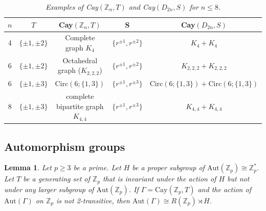 \documentclass[12pt,reqno,a4paper]{amsart}
\theoremstyle{definition}
\newtheorem{lem}[defn]{Lemma}
\begin{document}
\begin{table}[h!]
\centering
\begin{tabular}{|c|c|c|c|c|}
\hline
$n$ & $T$ & Cay$(\mathbb{Z}_{n},T)$ & S & Cay$(D_{2n},S)$\\
\hline
\hline
4 & $\{\pm 1, \pm 2\}$ & Complete graph $K_4$ & $\{r^{\pm 1}, r^{\pm 2}\}$ & $K_4 + K_{4}$\\

6 & $\{\pm 1, \pm 2\}$ & Octahedral graph ($K_{2,2,2}$) & $\{r^{\pm 1}, r^{\pm 2}\}$ & $K_{2,2,2} + K_{2,2,2}$ \\

6 & $\{\pm 1, \pm 3\}$ &  $\mathrm{Circ}(6;\{1,3\})$ & $\{r^{\pm 1}, r^{\pm 3}\}$ & $\mathrm{Circ}(6;\{1,3\}) + \mathrm{Circ}(6;\{1,3\})$ \\

8 & $\{\pm 1, \pm 3\}$ & complete bipartite graph $K_{4,4}$ & $\{r^{\pm 1}, r^{\pm 3}\}$ & $K_{4,4}+ K_{4,4}$\\
\hline
\end{tabular}
\vspace{2mm}
\caption{\em Examples of Cay$(\mathbb{Z}_{n},T)$ and Cay$(D_{2n},S)$ for $n \le 8$.}
\end{table}

\subsection{Automorphism groups}
\begin{lem}\label{Lemma 3.2}
{\em Let $p\geq 3$ be a prime. Let $H$ be a proper subgroup of $\mathrm{Aut}(\mathbb{Z}_p) \cong \mathbb{Z}_p^*$. Let $T$ be a generating set of $\mathbb{Z}_p$ that is invariant under the action of $H$ but not under any larger subgroup of $\mathrm{Aut}(\mathbb{Z}_p)$. 
If $\Gamma = \mathrm{Cay}(\mathbb{Z}_p,T)$ and the action of $\mathrm{Aut}(\Gamma)$ on $\mathbb{Z}_p$ is not 2-transitive, then $\mathrm{Aut}(\Gamma)\cong R(\mathbb{Z}_p) \rtimes H$.}    
\end{lem}
\end{document}
